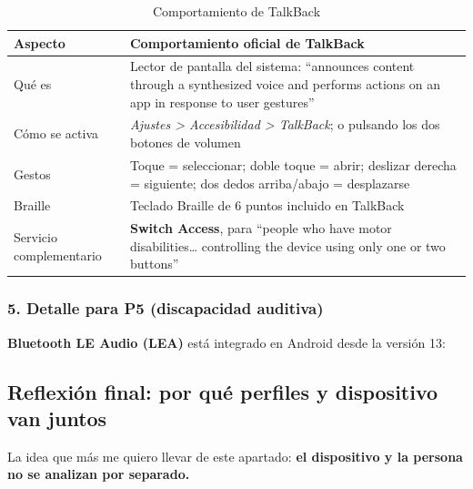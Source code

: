 \documentclass[11pt,a4paper]{article}
\begin{document}
	\begin{table}[htbp]
		\centering
		\small
		\begin{tabularx}{\textwidth}{@{}>{\RaggedRight\arraybackslash}p{3cm} >{\RaggedRight\arraybackslash}X@{}}
			\toprule
			\rowcolor{primary}
			\textcolor{paper}{\sffamily\bfseries Aspecto} & \textcolor{paper}{\sffamily\bfseries Comportamiento oficial de TalkBack} \\
			\midrule
			Qué es & Lector de pantalla del sistema: \enquote{announces content through a synthesized voice and performs actions on an app in response to user gestures} \\
			\rowcolor{soft}
			Cómo se activa & \emph{Ajustes > Accesibilidad > TalkBack}; o pulsando los dos botones de volumen \\
			Gestos & Toque = seleccionar; doble toque = abrir; deslizar derecha = siguiente; dos dedos arriba/abajo = desplazarse \\
			\rowcolor{soft}
			Braille & Teclado Braille de 6 puntos incluido en TalkBack \\
			Servicio complementario & \textbf{Switch Access}, para \enquote{people who have motor disabilities\ldots{} controlling the device using only one or two buttons} \\
			\bottomrule
		\end{tabularx}
		\caption{Comportamiento de TalkBack}
	\end{table}
	
	\subsubsection*{5. Detalle para P5 (discapacidad auditiva)}
	
	\textbf{Bluetooth LE Audio (LEA)} está integrado en Android desde la versión 13:
	
	\subsection{Reflexión final: por qué perfiles y dispositivo van juntos}
	
	La idea que más me quiero llevar de este apartado: \textbf{el dispositivo y la persona no se analizan por separado.}
	
\end{document}

